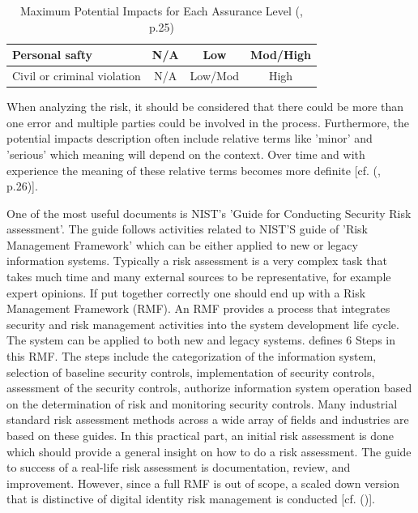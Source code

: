 \begin{table}[h]
\begin{tabular}{lccc}
		\multicolumn{1}{|l|}{Personal safty}                                                                                        & \multicolumn{1}{c|}{N/A}        & \multicolumn{1}{c|}{Low}        & \multicolumn{1}{c|}{Mod/High}   \\ \hline
		\multicolumn{1}{|l|}{Civil or criminal violation}                                                                           & \multicolumn{1}{c|}{N/A}        & \multicolumn{1}{c|}{Low/Mod}    & \multicolumn{1}{c|}{High}       \\ \hline
	\end{tabular}
	\endgroup
	\caption{Maximum Potential Impacts for Each Assurance Level (\cite{NIST:2017:DIG}, p.25)} \label{tab:maxImpacts}
\end{table}

When analyzing the risk, it should be considered that there could be more than one error and multiple parties could be involved in the process. Furthermore, the potential impacts description often include relative terms like 'minor' and 'serious' which meaning will depend on the context. Over time and with experience the meaning of these relative terms becomes more definite [cf. (\cite{NIST:2017:DIG}, p.26)].

One of the most useful documents is NIST's 'Guide for Conducting Security Risk assessment'. The guide follows activities related to NIST'S guide of 'Risk Management Framework' which can be either applied to new or legacy information systems. Typically a risk assessment is a very complex task that takes much time and many external sources to be representative, for example expert opinions. If put together correctly one should end up with a Risk Management Framework (RMF). An RMF provides a process that integrates security and risk management activities into the system development life cycle. The system can be applied to both new and legacy systems. \cite{NIST:2018:RMF} defines 6 Steps in this RMF. The steps include the categorization of the information system, selection of baseline security controls, implementation of security controls, assessment of the security controls, authorize information system operation based on the determination of risk and monitoring security controls. Many industrial standard risk assessment methods across a wide array of fields and industries are based on these guides.  In this practical part, an initial risk assessment is done which should provide a general insight on how to do a risk assessment. The guide to success of a real-life risk assessment is documentation, review, and improvement.  However, since a full RMF is out of scope, a scaled down version that is distinctive of digital identity risk management is conducted  [cf. (\cite{NIST:2018:RMF})].


